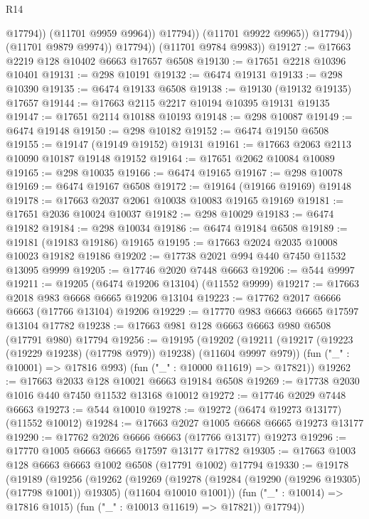 \begin{lexlean}{R14}
\begin{coremodule}
                            @17794))
                        (@11701 @9959 @9964))
                      @17794))
                  (@11701 @9922 @9965))
                @17794))
            (@11701 @9879 @9974))
          @17794))
      (@11701 @9784 @9983))
@19127 := @17663 @2219 @128 @10402 @6663 @17657 @6508
@19130 := @17651 @2218 @10396 @10401
@19131 := @298 @10191
@19132 := @6474 @19131
@19133 := @298 @10390
@19135 := @6474 @19133 @6508
@19138 := @19130 (@19132 @19135) @17657
@19144 := @17663 @2115 @2217 @10194 @10395 @19131 @19135
@19147 := @17651 @2114 @10188 @10193
@19148 := @298 @10087
@19149 := @6474 @19148
@19150 := @298 @10182
@19152 := @6474 @19150 @6508
@19155 := @19147 (@19149 @19152) @19131
@19161 := @17663 @2063 @2113 @10090 @10187 @19148 @19152
@19164 := @17651 @2062 @10084 @10089
@19165 := @298 @10035
@19166 := @6474 @19165
@19167 := @298 @10078
@19169 := @6474 @19167 @6508
@19172 := @19164 (@19166 @19169) @19148
@19178 := @17663 @2037 @2061 @10038 @10083 @19165 @19169
@19181 := @17651 @2036 @10024 @10037
@19182 := @298 @10029
@19183 := @6474 @19182
@19184 := @298 @10034
@19186 := @6474 @19184 @6508
@19189 := @19181 (@19183 @19186) @19165
@19195 := @17663 @2024 @2035 @10008 @10023 @19182 @19186
@19202 := @17738 @2021 @994 @440 @7450 @11532 @13095 @9999
@19205 := @17746 @2020 @7448 @6663
@19206 := @544 @9997
@19211 := @19205 (@6474 @19206 @13104) (@11552 @9999)
@19217 := @17663 @2018 @983 @6668 @6665 @19206 @13104
@19223 := @17762 @2017 @6666 @6663 (@17766 @13104) @19206
@19229 := @17770 @983 @6663 @6665 @17597 @13104 @17782
@19238 := @17663 @981 @128 @6663 @6663 @980 @6508 (@17791 @980) @17794
@19256 := @19195
    (@19202
      (@19211 (@19217 (@19223 (@19229 @19238) (@17798 @979)) @19238) (@11604 @9997 @979))
      (fun ("_" : @10001) => @17816 @993)
      (fun ("_" : @10000 @11619) => @17821))
@19262 := @17663 @2033 @128 @10021 @6663 @19184 @6508
@19269 := @17738 @2030 @1016 @440 @7450 @11532 @13168 @10012
@19272 := @17746 @2029 @7448 @6663
@19273 := @544 @10010
@19278 := @19272 (@6474 @19273 @13177) (@11552 @10012)
@19284 := @17663 @2027 @1005 @6668 @6665 @19273 @13177
@19290 := @17762 @2026 @6666 @6663 (@17766 @13177) @19273
@19296 := @17770 @1005 @6663 @6665 @17597 @13177 @17782
@19305 := @17663 @1003 @128 @6663 @6663 @1002 @6508 (@17791 @1002) @17794
@19330 := @19178
    (@19189
      (@19256
        (@19262
          (@19269
            (@19278 (@19284 (@19290 (@19296 @19305) (@17798 @1001)) @19305) (@11604 @10010 @1001))
            (fun ("_" : @10014) => @17816 @1015)
            (fun ("_" : @10013 @11619) => @17821))
          @17794))

\end{coremodule}
\end{lexlean}
